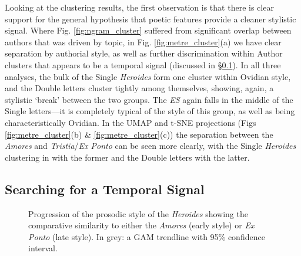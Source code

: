 \documentclass[twocolumn, switch, a4paper]{article} %
\begin{document}
Looking at the clustering results, the first observation is that there is
clear support for the general hypothesis that poetic features provide a
cleaner stylistic signal. Where Fig. \ref{fig:ngram_cluster} suffered from
significant overlap between authors that was driven by topic, in Fig.
\ref{fig:metre_cluster}(a) we have clear separation by authorial style, as
well as further discrimination within Author clusters that appears to be a
temporal signal (discussed in \S \ref{sec: temporal}). In all three analyses,
the bulk of the Single \emph{Heroides} form one cluster within Ovidian style,
and the Double letters cluster tightly among themselves, showing, again, a
stylistic `break' between the two groups. The \emph{ES} again falls in the
middle of the Single letters---it is completely typical of the style of this
group, as well as being characteristically Ovidian. In the UMAP and t-SNE
projections (Figs \ref{fig:metre_cluster}(b) \& \ref{fig:metre_cluster}(c))
the separation between the \emph{Amores} and \emph{Tristia}/\emph{Ex Ponto}
can be seen more clearly, with the Single \emph{Heroides} clustering in with
the former and the Double letters with the latter.

\subsection{Searching for a Temporal Signal}
\label{sec: temporal}

\begin{figure}
  \caption{Progression of the prosodic style of the \emph{Heroides} showing
  the comparative similarity to either the \emph{Amores} (early style) or
  \emph{Ex Ponto} (late style). In grey: a GAM trendline with 95\% confidence
  interval.}
  \label{fig:ampont}
  \centering
  \qquad
\end{figure}
\end{document}
